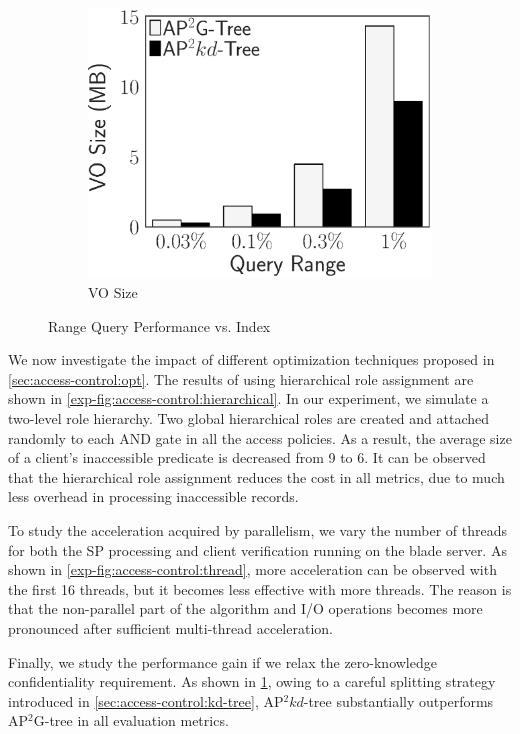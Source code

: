 \begin{figure}[t]
\begin{subfigure}{.33\linewidth}
        \includegraphics[height=\ht\figbox]{exp-figs/access-control/index_1_vo.eps}
        \caption{VO Size}
    \end{subfigure}
    \caption{Range Query Performance vs. Index}\label{exp-fig:access-control:index}
\end{figure}

We now investigate the impact of different optimization techniques proposed in \cref{sec:access-control:opt}. The results of using hierarchical role assignment are shown in \cref{exp-fig:access-control:hierarchical}. In our experiment, we simulate a two-level role hierarchy. Two global hierarchical roles are created and attached randomly to each AND gate in all the access policies. As a result, the average size of a client's inaccessible predicate is decreased from 9 to 6. It can be observed that the hierarchical role assignment reduces the cost in all metrics, due to much less overhead in processing inaccessible records.

To study the acceleration acquired by parallelism, we vary the number of threads for both the SP processing and client verification running on the blade server. As shown in \cref{exp-fig:access-control:thread}, more acceleration can be observed with the first 16 threads, but it becomes less effective with more threads. The reason is that the non-parallel part of the algorithm and I/O operations becomes more pronounced after sufficient multi-thread acceleration.

Finally, we study the performance gain if we relax the zero-knowledge confidentiality requirement. As shown in \cref{exp-fig:access-control:index}, owing to a careful splitting strategy introduced in \cref{sec:access-control:kd-tree}, AP$^2kd$-tree substantially outperforms AP$^2$G-tree in all evaluation metrics.

